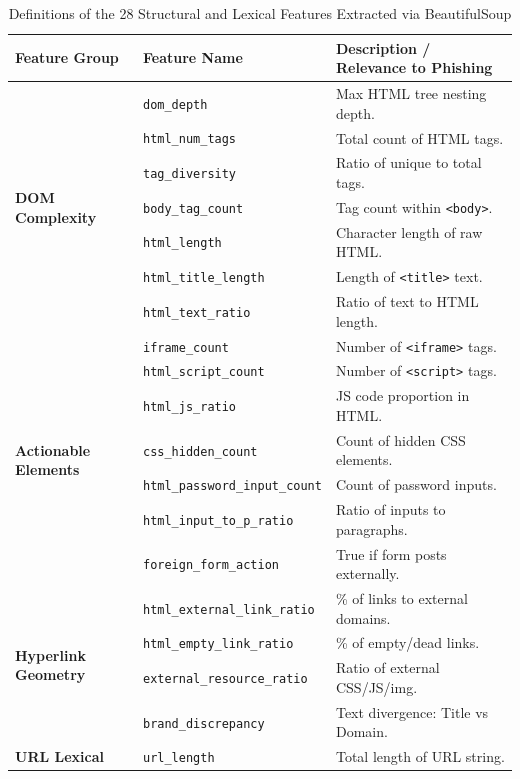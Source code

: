 \documentclass[conference]{IEEEtran}
\begin{document}
\begin{table}[t]
\caption{Definitions of the 28 Structural and Lexical Features Extracted via BeautifulSoup}
\label{tab:features}
\begin{center}
\begin{tabular}{llp{10cm}}
\toprule
\textbf{Feature Group} & \textbf{Feature Name} & \textbf{Description / Relevance to Phishing} \\
\midrule
\multirow{7}{*}{\textbf{DOM Complexity}} 
& \texttt{dom\_depth} & Max HTML tree nesting depth. \\
& \texttt{html\_num\_tags} & Total count of HTML tags. \\
& \texttt{tag\_diversity} & Ratio of unique to total tags. \\
& \texttt{body\_tag\_count} & Tag count within \texttt{<body>}. \\
& \texttt{html\_length} & Character length of raw HTML. \\
& \texttt{html\_title\_length} & Length of \texttt{<title>} text. \\
& \texttt{html\_text\_ratio} & Ratio of text to HTML length. \\
\midrule
\multirow{7}{*}{\textbf{Actionable Elements}} 
& \texttt{iframe\_count} & Number of \texttt{<iframe>} tags. \\
& \texttt{html\_script\_count} & Number of \texttt{<script>} tags. \\
& \texttt{html\_js\_ratio} & JS code proportion in HTML. \\
& \texttt{css\_hidden\_count} & Count of hidden CSS elements. \\
& \texttt{html\_password\_input\_count} & Count of password inputs. \\
& \texttt{html\_input\_to\_p\_ratio} & Ratio of inputs to paragraphs. \\
& \texttt{foreign\_form\_action} & True if form posts externally. \\
\midrule
\multirow{4}{*}{\textbf{Hyperlink Geometry}} 
& \texttt{html\_external\_link\_ratio} & \% of links to external domains. \\
& \texttt{html\_empty\_link\_ratio} & \% of empty/dead links. \\
& \texttt{external\_resource\_ratio} & Ratio of external CSS/JS/img. \\
& \texttt{brand\_discrepancy} & Text divergence: Title vs Domain. \\
\midrule
\multirow{10}{*}{\textbf{URL Lexical}} 
& \texttt{url\_length} & Total length of URL string. \\

\end{tabular}
\end{center}
\end{table}
\end{document}

